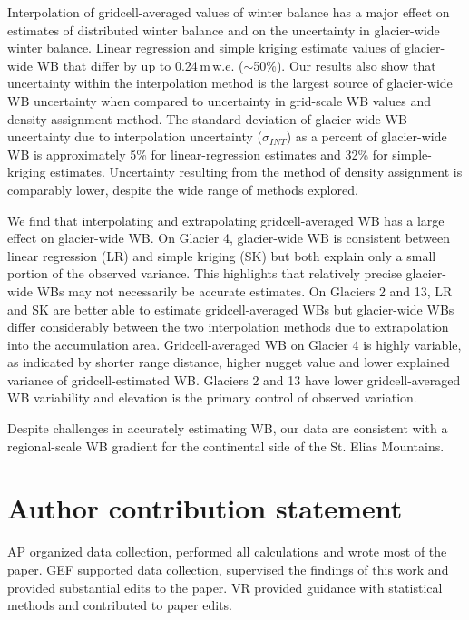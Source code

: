 \documentclass[twocolumn, letterpaper]{igs}
\begin{document}
Interpolation of gridcell-averaged values of winter balance has a major effect on estimates of distributed winter balance and on the uncertainty in glacier-wide winter balance. Linear regression and simple kriging estimate values of glacier-wide WB that differ by up to 0.24\,m\,w.e. ($\sim$50\%). Our results also show that uncertainty within the interpolation method is the largest source of glacier-wide WB uncertainty when compared to uncertainty in grid-scale WB values and density assignment method. The standard deviation of glacier-wide WB uncertainty due to interpolation uncertainty ($\sigma_{INT}$) as a percent of glacier-wide WB is approximately 5\% for linear-regression estimates and 32\% for simple-kriging estimates. Uncertainty resulting from the method of density assignment is comparably lower, despite the wide range of methods explored.



We find that interpolating and extrapolating gridcell-averaged WB has a large effect on glacier-wide WB. On Glacier 4, glacier-wide WB is consistent between linear regression (LR) and simple kriging (SK) but both explain only a small portion of the observed variance. This highlights that relatively precise glacier-wide WBs may not necessarily be accurate estimates. On Glaciers 2 and 13, LR and SK are better able to estimate gridcell-averaged WBs but glacier-wide WBs differ considerably between the two interpolation methods due to extrapolation into the accumulation area. Gridcell-averaged WB on Glacier 4 is highly variable, as indicated by shorter range distance, higher nugget value and lower explained variance of gridcell-estimated WB. Glaciers 2 and 13 have lower gridcell-averaged WB variability and elevation is the primary control of observed variation.

 
 
  Despite challenges in accurately estimating WB, our data are consistent with a regional-scale WB gradient for the continental side of the St. Elias Mountains. 

\section{Author contribution statement}

AP organized data collection, performed all calculations and wrote most of the paper. GEF supported data collection, supervised the findings of this work and provided substantial edits to the paper. VR provided guidance with statistical methods and contributed to paper edits.
\end{document}

